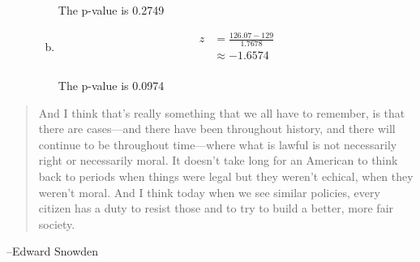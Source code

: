 \documentclass[letterpaper, landscape]{exam}
\begin{document}
\begin{description}
\begin{enumerate}[(a)]
            The p-value is 0.2749

          \item 
            \begin{align*}
              z & = \frac{126.07 - 129}{1.7678} \\
                & \approx -1.6574 \\
            \end{align*}

            The p-value is 0.0974 

        \end{enumerate}

  \end{description}

  \else
    \vspace{2 cm}
    \begin{quote}
      \begin{em}
        And I think that's really something that we all have to remember, is
        that there are cases---and there have been throughout history, and there
        will continue to be throughout time---where what is lawful is not
        necessarily right or necessarily moral. It doesn't take long for an
        American to think back to periods when things were legal but they
        weren't echical, when they weren't moral. And I think today when we see
        similar policies, every citizen has a duty to resist those and to try to
        build a better, more fair society.
      \end{em}
    \end{quote}
    \hspace{1 cm}--Edward Snowden
  \fi
\end{document}
